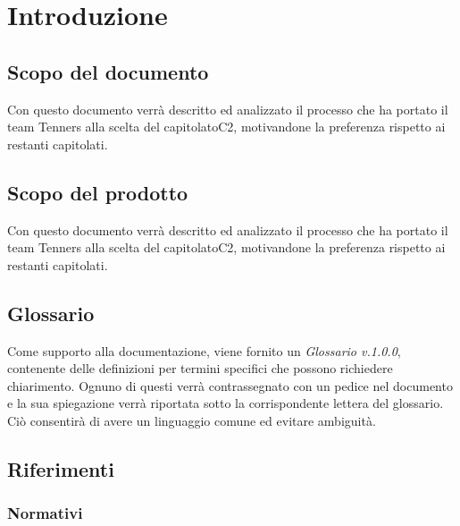 \section{Introduzione}

\subsection{Scopo del documento}
Con questo documento verrà descritto ed analizzato il processo che ha portato il team Tenners alla scelta del capitolato\glo C2, motivandone la preferenza rispetto ai restanti capitolati.

\subsection{Scopo del prodotto}
Con questo documento verrà descritto ed analizzato il processo che ha portato il team Tenners alla scelta del capitolato\glo C2, motivandone la preferenza rispetto ai restanti capitolati.
	
\subsection{Glossario}
Come supporto alla documentazione, viene fornito un \textit{Glossario v.1.0.0}, contenente delle definizioni per termini specifici che possono richiedere chiarimento. Ognuno di questi verrà contrassegnato con un pedice \glo nel documento e la sua spiegazione verrà riportata sotto la corrispondente lettera del glossario. Ciò consentirà di avere un linguaggio comune ed evitare ambiguità. 
	
\subsection{Riferimenti}
\subsubsection{Normativi}
